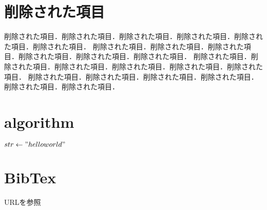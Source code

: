 \section{削除された項目}
削除された項目．削除された項目．削除された項目．削除された項目．削除された項目．削除された項目．
削除された項目．削除された項目．削除された項目．削除された項目．削除された項目．削除された項目．
削除された項目．削除された項目．削除された項目．削除された項目．削除された項目．削除された項目．
削除された項目．削除された項目．削除された項目．削除された項目．削除された項目．削除された項目．

\section{algorithm}
\begin{algorithmic}
    \State $str \gets "hello world"$
    \EndFor
    \EndFunction
\end{algorithmic}

\section{BibTex}
URL\cite{sagaweb}を参照